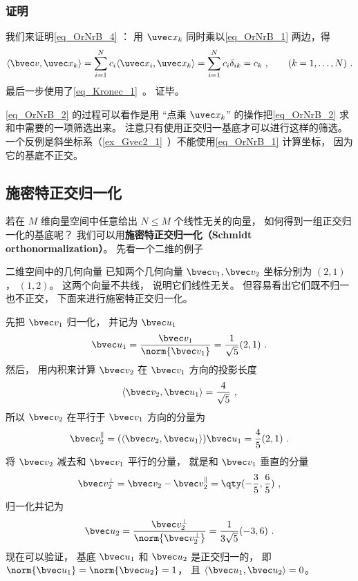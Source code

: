 \subsubsection{证明}
我们来证明\autoref{eq_OrNrB_4} ： 用 $\uvec x_k$ 同时乘以\autoref{eq_OrNrB_1} 两边，得
\begin{equation}\label{eq_OrNrB_2}
\langle \bvec v, \uvec x_k \rangle = \sum_{i = 1}^N  c_i \langle \uvec x_i, \uvec x_k \rangle = \sum_{i = 1}^N c_i \delta_{ik}  = c_k ~,\qquad (k = 1, \dots, N)~.
\end{equation}
最后一步使用了\autoref{eq_Kronec_1}~。 证毕。

\autoref{eq_OrNrB_2} 的过程可以看作是用 “点乘 $\uvec x_k$” 的操作把\autoref{eq_OrNrB_2} 求和中需要的一项筛选出来。 注意只有使用正交归一基底才可以进行这样的筛选。 一个反例是斜坐标系（\autoref{ex_Gvec2_1}~）不能使用\autoref{eq_OrNrB_1} 计算坐标， 因为它的基底不正交。


\subsection{施密特正交归一化}\label{sub_OrNrB_1}


若在 $M$ 维向量空间中任意给出 $N \leqslant M$ 个线性无关的向量， 如何得到一组正交归一化的基底呢？ 我们可以用\textbf{施密特正交归一化（Schmidt orthonormalization）}。 先看一个二维的例子

\begin{example}{二维空间中的几何向量}
已知两个几何向量 $\bvec v_1, \bvec v_2$ 坐标分别为 $(2, 1)$， $(1, 2)$。 这两个向量不共线， 说明它们线性无关。 但容易看出它们既不归一也不正交， 下面来进行施密特正交归一化。

先把 $\bvec v_1$ 归一化， 并记为 $\bvec u_1$
\begin{equation}
\bvec u_1 = \frac{\bvec v_1}{\norm{\bvec v_1}} = \frac{1}{\sqrt{5}} (2, 1)~.
\end{equation}
然后， 用内积来计算 $\bvec v_2$ 在 $\bvec v_1$ 方向的投影长度
\begin{equation}
\langle \bvec v_2, \bvec u_1 \rangle = \frac{4}{\sqrt{5}}~,
\end{equation}
所以 $\bvec v_2$ 在平行于 $\bvec v_1$ 方向的分量为
\begin{equation}
\bvec v_2^\parallel =  (\langle \bvec v_2, \bvec u_1 \rangle)\bvec u_1 = \frac{4}{5} (2, 1)~.
\end{equation}
将 $\bvec v_2$ 减去和 $\bvec v_1$ 平行的分量， 就是和 $\bvec v_1$ 垂直的分量
\begin{equation}
\bvec v_2^\bot = \bvec v_2 - \bvec v_2^\parallel = \qty(-\frac35, \frac65)~,
\end{equation}
归一化并记为
\begin{equation}
\bvec u_2 = \frac{\bvec v_2^\bot}{\norm{\bvec v_2^\bot}} = \frac{1}{3\sqrt{5}} (-3, 6)~.
\end{equation}
现在可以验证， 基底 $\bvec u_1$ 和 $\bvec u_2$ 是正交归一的， 即 $\norm{\bvec u_1} = \norm{\bvec u_2} = 1$， 且 $\langle \bvec u_1, \bvec u_2 \rangle = 0$。
\end{example}

